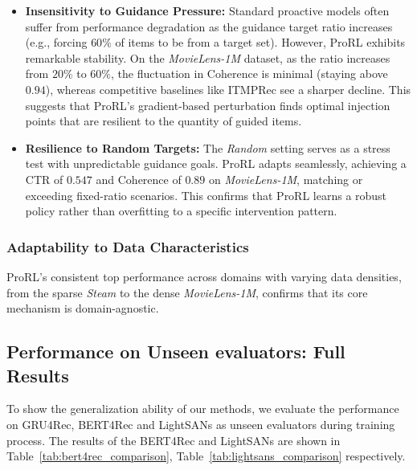 \begin{itemize}
    \item \textbf{Insensitivity to Guidance Pressure:} 
    Standard proactive models often suffer from performance degradation as the guidance target ratio increases (e.g., forcing $60\%$ of items to be from a target set). However, ProRL exhibits remarkable stability. On the \textit{MovieLens-1M} dataset, as the ratio increases from $20\%$ to $60\%$, the fluctuation in Coherence is minimal (staying above $0.94$), whereas competitive baselines like ITMPRec see a sharper decline. This suggests that ProRL's gradient-based perturbation finds optimal injection points that are resilient to the quantity of guided items.
    
    \item \textbf{Resilience to Random Targets:} 
    The \textit{Random} setting serves as a stress test with unpredictable guidance goals. ProRL adapts seamlessly, achieving a CTR of $0.547$ and Coherence of $0.89$ on \textit{MovieLens-1M}, matching or exceeding fixed-ratio scenarios. This confirms that ProRL learns a robust policy rather than overfitting to a specific intervention pattern.
\end{itemize}

\subsubsection{Adaptability to Data Characteristics}
ProRL's consistent top performance across domains with varying data densities, from the sparse \textit{Steam} to the dense \textit{MovieLens-1M}, confirms that its core mechanism is domain-agnostic.

\subsection{Performance on Unseen evaluators: Full Results}
\label{app:unseen evaluator}

To show the generalization ability of our methods, we evaluate the performance on GRU4Rec, BERT4Rec and LightSANs as unseen evaluators during training process. The results of the BERT4Rec and LightSANs are shown in Table~\ref{tab:bert4rec_comparison}, Table~\ref{tab:lightsans_comparison} respectively.

